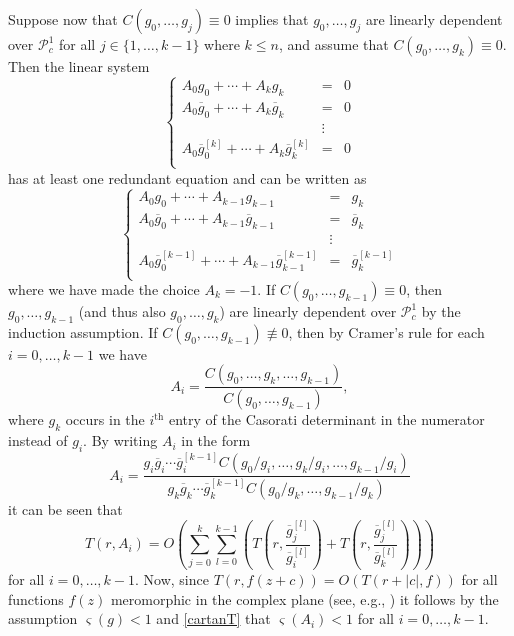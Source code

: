 \documentclass{amsart}
\theoremstyle{definition}
\numberwithin{equation}{section}
\numberwithin{theorem}{section}
\begin{document}
Suppose now that $C(g_0,\ldots,g_j)\equiv0$ implies that $g_0,\ldots,g_j$ are linearly dependent over $\mathcal{P}^1_c$ for all $j\in\{1,\ldots,k-1\}$ where $k\leq n$, and assume that $C(g_0,\ldots,g_k)\equiv0$. Then the linear system
	\begin{equation}\label{system3}
	\left\{\begin{array}{lcl}
	A_0g_0+\cdots+A_kg_k &=&0\\
	A_0\overline{g}_0+\cdots+A_k \overline{g}_k&=&0\\
	&\vdots&\\
	A_0\overline{g}^{[k]}_0+\cdots+A_k \overline{g}^{[k]}_k&=&0\\
	\end{array}\right.
	\end{equation}
has at least one redundant equation and can be written as
	\begin{equation}\label{system4}
	\left\{\begin{array}{lcl}
	A_0g_0+\cdots+A_{k-1}g_{k-1} &=&g_k\\
	A_0\overline{g}_0+\cdots+A_{k-1} \overline{g}_{k-1}&=&\overline{g}_k\\
	&\vdots&\\
	A_0\overline{g}^{[k-1]}_0+\cdots+A_{k-1} \overline{g}^{[k-1]}_{k-1}&=&\overline{g}^{[k-1]}_k\\
	\end{array}\right.
	\end{equation}
where we have made the choice $A_k=-1$. If $C(g_0,\ldots,g_{k-1})\equiv0$, then $g_0,\ldots,g_{k-1}$ (and thus also $g_0,\ldots,g_{k}$) are linearly dependent over $\mathcal{P}^1_c$ by the induction assumption. If $C(g_0,\ldots,g_{k-1})\not\equiv0$, then by Cramer's rule for each $i=0,\ldots,k-1$ we have
	\begin{equation*}
	A_i=\frac{C(g_0,\ldots,g_k,\ldots,g_{k-1})}{C(g_0,\ldots,g_{k-1})},
	\end{equation*}
where $g_k$ occurs in the $i^\textrm{th}$ entry of the Casorati determinant in the numerator instead of $g_i$. By writing $A_i$ in the form
	\begin{equation*}
	A_i=\frac{g_i\overline{g}_i\cdots \overline{g}^{[k-1]}_i C(g_0/g_i,\ldots,g_k/g_i,\ldots,g_{k-1}/g_i)}			 {g_k\overline{g}_k\cdots \overline{g}^{[k-1]}_k C(g_0/g_k,\ldots,g_{k-1}/g_k)}
	\end{equation*}
it can be seen that
	\begin{equation*}
	 T(r,A_i)=O\left(\sum_{j=0}^{k}\sum_{l=0}^{k-1}\left(T\left(r,\frac{\overline{g}^{[l]}_j}{\overline{g}^{[l]}_i}\right)+T\left(r,\frac{\overline{g}^{[l]}_j}{\overline{g}^{[l]}_k}\right)\right)\right)
	\end{equation*}
for all $i=0,\ldots,k-1$. Now, since $T(r,f(z+c))=O(T(r+|c|,f))$ for all functions $f(z)$ meromorphic in the complex plane (see, e.g., \cite[pp.~66--67]{goldbergo:08}) it follows by the assumption $\varsigma(g)<1$ and \eqref{cartanT} that $\varsigma(A_i)<1$ for all $i=0,\ldots,k-1$.
\end{document}
